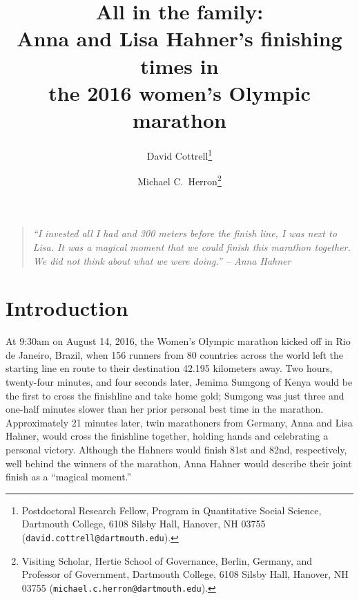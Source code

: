 \documentclass[12pt,titlepage]{article}
\begin{document}
\sloppy
\thispagestyle{empty}


\renewcommand{\topfraction}{.85}
\renewcommand{\bottomfraction}{.7}
\renewcommand{\textfraction}{.15}
\renewcommand{\floatpagefraction}{.66}
\renewcommand{\dbltopfraction}{.66}
\renewcommand{\dblfloatpagefraction}{.66}

\newcommand{\Yi}{\ensuremath{Y_i}}



\title{\Large{All in the family:\\Anna and Lisa Hahner's finishing
    times in\\the 2016 women's Olympic
  marathon}}\author{David Cottrell\thanks{Postdoctoral Research
  Fellow, Program in Quantitative Social Science, Dartmouth College,
    6108 Silsby Hall, Hanover, NH
    03755 (\texttt{david.cottrell@dartmouth.edu}).} \and Michael C.\
  Herron\thanks{Visiting Scholar, Hertie School of Governance, Berlin,
    Germany, and Professor of Government, Dartmouth College, 6108
    Silsby Hall, Hanover, NH 03755
    (\texttt{michael.c.herron@dartmouth.edu}).}}


\maketitle \doublespacing 




\begin{quote}
  \emph{``I invested all I had and 300 meters before the finish line,
    I was next to Lisa. It was a magical moment that we could finish
    this marathon together. We did not think about what we were
    doing.'' -- Anna Hahner}
\end{quote}


\section*{Introduction}

At 9:30am on August 14, 2016, the Women's Olympic marathon kicked off
in Rio de Janeiro, Brazil, when 156 runners from 80 countries across
the world left the starting line en route to their destination 42.195
kilometers away. Two hours, twenty-four minutes, and four seconds
later, Jemima Sumgong of Kenya would be the first to cross the
finishline and take home gold; Sumgong was just three and one-half
minutes slower than her prior personal best time in the
marathon. Approximately 21 minutes later, twin marathoners from
Germany, Anna and Lisa Hahner, would cross the finishline together,
holding hands and celebrating a personal victory. Although the Hahners
would finish 81st and 82nd, respectively, well behind the winners of
the marathon, Anna Hahner would describe their joint finish as a
``magical moment.''
\end{document}
